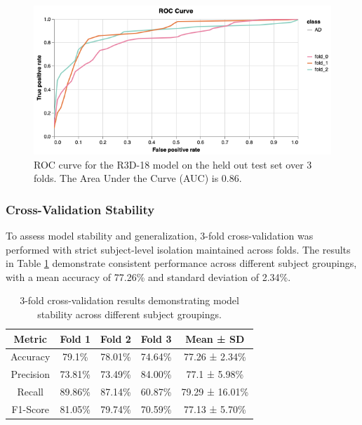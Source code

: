 \documentclass[12pt, a4paper]{article}
\begin{document}
\begin{figure}[htbp]
  \centering
  \includegraphics[width=\textwidth]{figures/ROC3F.png}
  \caption{ROC curve for the R3D-18 model on the held out test set over 3 folds. The Area Under the Curve (AUC) is 0.86.}
  \label{fig:roc_curve}
\end{figure}

\subsubsection{Cross-Validation Stability}

To assess model stability and generalization, 3-fold cross-validation was performed with strict subject-level isolation maintained across folds. The results in Table \ref{tab:cross_validation} demonstrate consistent performance across different subject groupings, with a mean accuracy of 77.26\% and standard deviation of 2.34\%.

\begin{table}[htbp]
\centering
\begin{tabular}{|c|c|c|c|c|}
\hline
\textbf{Metric} & \textbf{Fold 1} & \textbf{Fold 2} & \textbf{Fold 3} & \textbf{Mean ± SD} \\
\hline
Accuracy & 79.1\% & 78.01\% & 74.64\% & 77.26 ± 2.34\% \\
\hline
Precision & 73.81\% & 73.49\% & 84.00\% & 77.1 ± 5.98\% \\
\hline
Recall & 89.86\% & 87.14\% & 60.87\% & 79.29 ± 16.01\% \\
\hline
F1-Score & 81.05\% & 79.74\% & 70.59\% & 77.13 ± 5.70\% \\
\hline
\end{tabular}
\caption{3-fold cross-validation results demonstrating model stability across different subject groupings.}
\label{tab:cross_validation}
\end{table}
\end{document}
